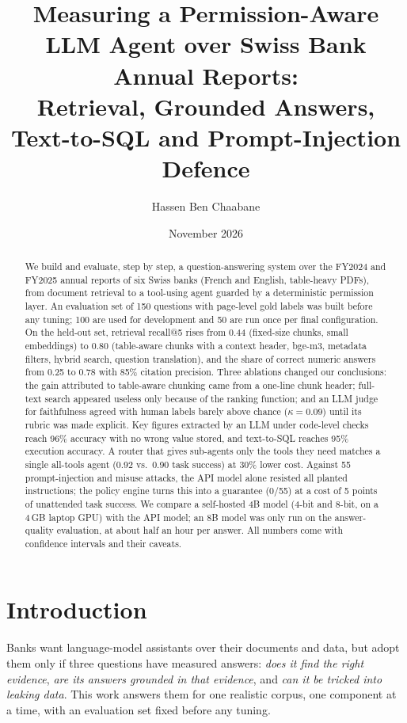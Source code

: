 \documentclass[10pt,a4paper]{article}
\title{Measuring a Permission-Aware LLM Agent over Swiss Bank Annual Reports:\\
Retrieval, Grounded Answers, Text-to-SQL and Prompt-Injection Defence}
\author{Hassen Ben Chaabane}
\date{November 2026}
\begin{document}
\maketitle

\begin{abstract}
We build and evaluate, step by step, a question-answering system over the FY2024 and FY2025 annual reports
of six Swiss banks (French and English, table-heavy PDFs), from document retrieval to a tool-using agent
guarded by a deterministic permission layer. An evaluation set of 150 questions with page-level gold labels
was built before any tuning; 100 are used for development and 50 are run once per final configuration.
On the held-out set, retrieval recall@5 rises from 0.44 (fixed-size chunks, small embeddings) to 0.80
(table-aware chunks with a context header, bge-m3, metadata filters, hybrid search, question translation),
and the share of correct numeric answers from 0.25 to 0.78 with 85\% citation precision. Three ablations
changed our conclusions: the gain attributed to table-aware chunking came from a one-line chunk header; full-text
search appeared useless only because of the ranking function; and an LLM judge for faithfulness agreed with
human labels barely above chance ($\kappa=0.09$) until its rubric was made explicit. Key figures extracted by an
LLM under code-level checks reach 96\% accuracy with no wrong value stored, and text-to-SQL reaches 95\%
execution accuracy. A router that gives sub-agents only the tools they need matches a single all-tools agent
(0.92 vs.\ 0.90 task success) at 30\% lower cost. Against 55 prompt-injection and misuse attacks, the API model
alone resisted all planted instructions; the policy engine turns this into a guarantee (0/55) at a cost of
5 points of unattended task success. We compare a self-hosted 4B model (4-bit and 8-bit, on a 4\,GB laptop GPU) with the API model; an 8B model
was only run on the answer-quality evaluation, at about half an hour per answer. All numbers come with confidence intervals and their caveats.
\end{abstract}

\section{Introduction}
Banks want language-model assistants over their documents and data, but adopt them only if three questions
have measured answers: \emph{does it find the right evidence}, \emph{are its answers grounded in that evidence},
and \emph{can it be tricked into leaking data}. This work answers them for one realistic corpus, one
component at a time, with an evaluation set fixed before any tuning.
\end{document}
